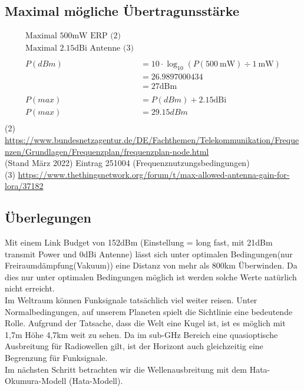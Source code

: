\documentclass[12pt,a4paper]{article}
\begin{document}
\subsection{Maximal mögliche Übertragunsstärke}
\begin{align*}
\text{Maximal 500mW ERP (2)} \\
\text{Maximal 2.15dBi Antenne (3)} \\
\\
P(dBm) &= 10 \cdot \log_{10} (P(500 \ \mathrm{mW}) \div 1 \ \mathrm{mW}) \\
&= 26.9897000434 \\
&= 27\mathrm{dBm} \\
\\
P(max)&=P(dBm)+2.15\mathrm{dBi}\\
P(max)&=29.15dBm\\
\end{align*}
(2) \url{https://www.bundesnetzagentur.de/DE/Fachthemen/Telekommunikation/Frequenzen/Grundlagen/Frequenzplan/frequenzplan-node.html}\\
(Stand März 2022) Eintrag 251004 (Frequenznutzungsbedingungen)\\
(3) \url{https://www.thethingsnetwork.org/forum/t/max-allowed-antenna-gain-for-lora/37182}\\
\newpage
\subsection{Überlegungen}

Mit einem Link Budget von 152dBm (Einstellung = long fast, mit 21dBm transmit Power und 0dBi Antenne) lässt sich unter optimalen Bedingungen(nur Freiraumdämpfung(Vakuum)) eine Distanz von mehr als 800km Überwinden.
Da dies nur unter optimalen Bedingungen möglich ist werden solche Werte natürlich nicht erreicht.\\

Im Weltraum können Funksignale tatsächlich viel weiter reisen. Unter Normalbedingungen, auf unserem Planeten spielt die Sichtlinie eine bedeutende Rolle.
Aufgrund der Tatsache, dass die Welt eine Kugel ist, ist es möglich mit 1,7m Höhe 4,7km weit zu sehen.
Da im sub-GHz Bereich eine quasioptische Ausbreitung für Radiowellen gilt, ist der Horizont auch gleichzeitig eine Begrenzung für Funksignale.\\

Im nächsten Schritt betrachten wir die Wellenausbreitung mit dem Hata-Okumura-Modell (Hata-Modell).\\
\end{document}
